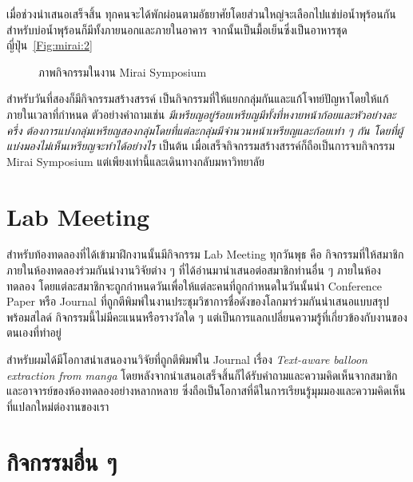 เมื่อช่วงนำเสนอเสร็จสิ้น ทุกคนจะได้พักผ่อนตามอัธยาศัยโดยส่วนใหญ่จะเลือกไปแช่บ่อน้ำพุร้อนกัน สำหรับบ่อน้ำพุร้อนก็มีทั้งภายนอกและภายในอาคาร จากนั้นเป็นมื้อเย็นซึ่งเป็นอาหารชุดญี่ปุ่น~\ref{Fig:mirai:2}

\begin{figure}[!h]
    \centering
    \caption{ภาพกิจกรรมในงาน Mirai Symposium}
    \label{Fig:mirai}
\end{figure}

สำหรับวันที่สองก็มีกิจกรรมสร้างสรรค์ เป็นกิจกรรมที่ให้แยกกลุ่มกันและแก้โจทย์ปัญหาโดยให้แก้ภายในเวลาที่กำหนด ตัวอย่างคำถามเช่น \textit{มีเหรียญอยู่ร้อยเหรียญมีทั้งที่หงายหน้าก้อยและหัวอย่างละครึ่ง ต้องการแบ่งกลุ่มเหรียญสองกลุ่มโดยที่แต่ละกลุ่มมีจำนวนหน้าเหรียญและก้อยเท่า ๆ กัน โดยที่ผู้แบ่งมองไม่เห็นเหรียญจะทำได้อย่างไร} เป็นต้น เมื่อเสร็จกิจกรรมสร้างสรรค์ก็ถือเป็นการจบกิจกรรม Mirai Symposium แต่เพียงเท่านี้และเดินทางกลับมหาวิทยาลัย

\section{Lab Meeting}

สำหรับท้องทดลองที่ได้เข้ามาฝึกงานนั้นมีกิจกรรม Lab Meeting ทุกวันพุธ คือ กิจกรรมที่ให้สมาชิกภายในห้องทดลองร่วมกันนำงานวิจัยต่าง ๆ ที่ได้อ่านมานำเสนอต่อสมาชิกท่านอื่น ๆ ภายในห้องทดลอง โดยแต่ละสมาชิกจะถูกกำหนดวันเพื่อให้แต่ละคนที่ถูกกำหนดในวันนั้นนำ Conference Paper หรือ Journal ที่ถูกตีพิมพ์ในงานประชุมวิชาการชื่อดังของโลกมาร่วมกันนำเสนอแบบสรุปพร้อมสไลด์ กิจกรรมนี้ไม่มีคะแนนหรือรางวัลใด ๆ แต่เป็นการแลกเปลี่ยนความรู้ที่เกี่ยวข้องกับงานของตนเองที่ทำอยู่ 

สำหรับผมได้มีโอกาสนำเสนองานวิจัยที่ถูกตีพิมพ์ใน Journal เรื่อง \textit{Text-aware balloon extraction from manga} โดยหลังจากนำเสนอเสร็จสิ้นก็ได้รับคำถามและความคิดเห็นจากสมาชิกและอาจารย์ของห้องทดลองอย่างหลากหลาย ซึ่งถือเป็นโอกาสที่ดีในการเรียนรู้มุมมองและความคิดเห็นที่แปลกใหม่ต่องานของเรา

\section{กิจกรรมอื่น ๆ}

